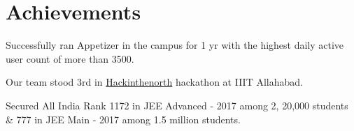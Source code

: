 \documentclass[letterpaper]{deedy-resume} %
\begin{document}
\begin{minipage}[t]{0.66\textwidth}


\section{Achievements} 
\begin{tightitemize}
\sectionspace %
\item Successfully ran Appetizer in the campus for 1 yr with the highest daily active user count of more than 3500. 
\item Our team stood 3rd in \href{https://www.hackinthenorth.com/}{Hackinthenorth} hackathon at IIIT Allahabad. 
\item Secured All India Rank 1172 in JEE Advanced - 2017 among 2, 20,000 students \& 777 in JEE Main - 2017 among 1.5 million students.


\end{tightitemize}

\sectionspace %


\end{minipage} %








\end{document}
